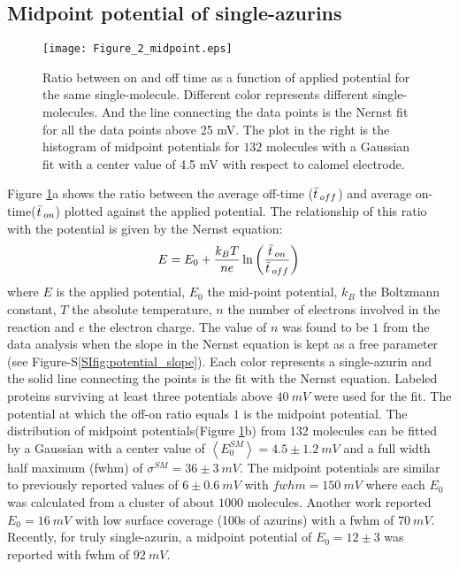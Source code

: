\subsection{Midpoint potential of single-azurins}
\begin{figure}
	\centering
	\texttt{[image: Figure\_2\_midpoint.eps]}
	\caption{Ratio between on and off time as a function of applied potential for the same single-molecule. Different color represents different single-molecules. And the line connecting the data points is the Nernst fit for all the data points above 25 mV. The plot in the right is the histogram of midpoint potentials for $132$ molecules with a Gaussian fit with a center value of 4.5 mV with respect to calomel electrode.}
	\label{fig:midpoint}
\end{figure}
Figure \ref{fig:midpoint}a shows the ratio between the average off-time ($\bar{t}\,_{off}$) and average on-time($\bar{t}\,_{on}$) plotted against the applied potential. The relationship of this ratio with the potential is given by the Nernst equation: 
\begin{equation}
	E = E_0 + \frac{k_BT}{n e}\ln\left(\frac{\bar{t}\,_{on}}{\bar{t}\,_{off}}\right)\,
	\label{eq:nernst}
\end{equation}
where $E$ is the applied potential, $E_0$ the mid-point potential, $k_B$ the Boltzmann constant, $T$ the absolute temperature, $n$ the number of electrons involved in the reaction and $e$ the electron charge. The value of $n$ was found to be $1$ from the data analysis when the slope in the Nernst equation is kept as a free parameter (see Figure-S\ref{SIfig:potential_slope}). Each color represents a single-azurin and the solid line connecting the points is the fit with the Nernst equation. Labeled proteins surviving at least three potentials above $40~mV$ were used for the fit. The potential at which the off-on ratio equals $1$ is the midpoint potential. The distribution of midpoint potentials(Figure \ref{fig:midpoint}b) from 132 molecules can be fitted by a Gaussian with a center value of $\left<E_0^{SM}\right>=4.5 \pm 1.2~mV$ and a full width half maximum (fwhm) of $\sigma^{SM}=36 \pm 3~mV$. The midpoint potentials are similar to previously reported values of $6\pm0.6~mV$ with $fwhm=150~mV$ where each $E_0$ was calculated from a cluster of about $1000$ molecules.\cite{davis2006monitoring} Another work reported $E_0 = 16~mV$ with low surface coverage (100s of azurins) with a fwhm of $70~mV$.\cite{salverda2010fluorescent} Recently, for truly single-azurin, a midpoint potential of $E_0=12\pm3$ was reported with fwhm of $92~mV$.\cite{akkilic2014chemically-induced}\\
